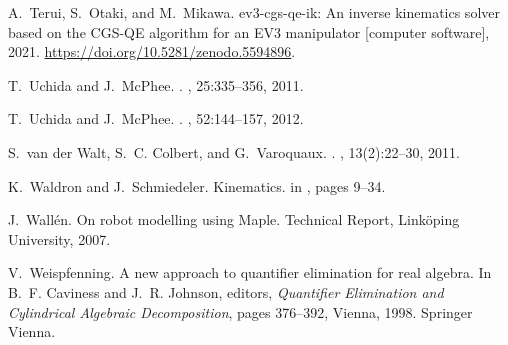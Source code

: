\documentclass{birkjour}
\theoremstyle{plain}
\theoremstyle{definition}
\begin{document}
\begin{thebibliography}{10}
        A.~Terui, S.~Otaki, and M.~Mikawa.
        \newblock ev3-cgs-qe-ik: An inverse kinematics solver based on the {CGS-QE}
        algorithm for an {EV3} manipulator [computer software], 2021.
        \newblock \url{https://doi.org/10.5281/zenodo.5594896}.

        T.~Uchida and J.~McPhee.
        .
        , 25:335--356, 2011.

        T.~Uchida and J.~McPhee.
        .
        , 52:144--157, 2012.

        S.~{van der Walt}, S.~C. {Colbert}, and G.~{Varoquaux}.
        .
        , 13(2):22--30, 2011.

        K.~Waldron and J.~Schmiedeler.
        \newblock Kinematics.
        \newblock in \cite{sic-kha2008}, pages 9--34.

        J.~Wall\'en.
        \newblock On robot modelling using {Maple}.
        \newblock Technical Report, Link\"oping University, 2007.

        V.~Weispfenning.
        \newblock A new approach to quantifier elimination for real algebra.
        \newblock In B.~F. Caviness and J.~R. Johnson, editors, {\em Quantifier
        Elimination and Cylindrical Algebraic Decomposition}, pages 376--392, Vienna,
        1998. Springer Vienna.

    \end{thebibliography}
\end{document}
